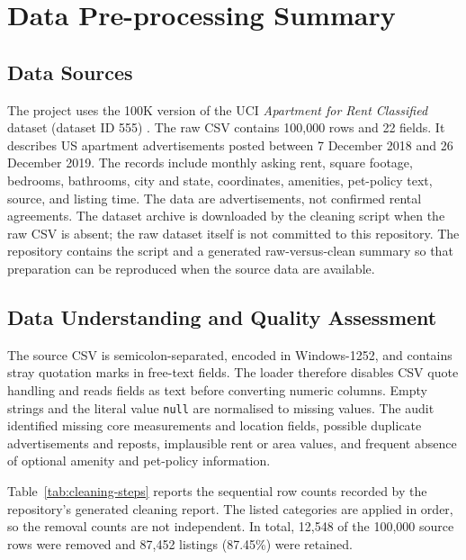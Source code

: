 \documentclass[12pt,a4paper]{report}
\begin{document}
\chapter{Data Pre-processing Summary}
\label{ch:preprocessing}

\section{Data Sources}

The project uses the 100K version of the UCI \emph{Apartment for Rent
Classified} dataset (dataset ID 555) \cite{uci_apartment_dataset}. The raw CSV
contains 100,000 rows and 22 fields. It describes US apartment advertisements
posted between 7 December 2018 and 26 December 2019. The records include
monthly asking rent, square footage, bedrooms, bathrooms, city and state,
coordinates, amenities, pet-policy text, source, and listing time. The data
are advertisements, not confirmed rental agreements. The dataset archive is
downloaded by the cleaning script when the raw CSV is absent; the raw dataset
itself is not committed to this repository. The repository contains the
script and a generated raw-versus-clean summary so that preparation can be
reproduced when the source data are available.

\section{Data Understanding and Quality Assessment}

The source CSV is semicolon-separated, encoded in Windows-1252, and contains
stray quotation marks in free-text fields. The loader therefore disables CSV
quote handling and reads fields as text before converting numeric columns.
Empty strings and the literal value \texttt{null} are normalised to missing
values. The audit identified missing core measurements and location fields,
possible duplicate advertisements and reposts, implausible rent or area
values, and frequent absence of optional amenity and pet-policy information.

Table~\ref{tab:cleaning-steps} reports the sequential row counts recorded by
the repository's generated cleaning report. The listed categories are applied
in order, so the removal counts are not independent. In total, 12,548 of the
100,000 source rows were removed and 87,452 listings (87.45\%) were retained.
\end{document}

